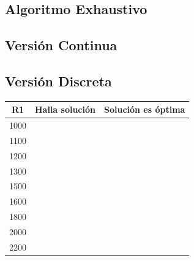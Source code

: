 \documentclass{llncs}
\begin{document}
	\subsection{Algoritmo Exhaustivo}
	\label{subsec:Resultados Exhaustivo}
	\subsection{Versión Continua}
	\label{subsec:Resultados Continuos}
	\subsection{Versión Discreta}
	\label{subsec:ResultadosDiscretos}
	
	   \begin{longtable}{|c|c|c|}
			\hline
			\multicolumn{1}{|c|}{R1} & \multicolumn{1}{c|}{Halla solución} & \multicolumn{1}{c|}{Solución es óptima} \\ \hline
			1000                     &                                                   &                                                      \\ \hline
			1100                     &                                                   &                                                      \\ \hline
			1200                     &                                                   &                                                      \\ \hline
			1300                     &                                                   &                                                      \\ \hline
			1500                     &                                                   &                                                      \\ \hline
			1600                     &                                                   &                                                      \\ \hline
			1800                     &                                                   &                                                      \\ \hline
			2000                     &                                                   &                                                      \\ \hline
			2200                     &                                                   &                                                      \\ \hline

\end{longtable}
\end{document}

